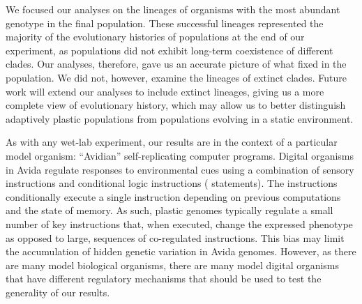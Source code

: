 We focused our analyses on the lineages of organisms with the most abundant genotype in the final population.
These successful lineages represented the majority of the evolutionary histories of populations at the end of our experiment, as populations did not exhibit long-term coexistence of different clades.
Our analyses, therefore, gave us an accurate picture of what fixed in the population.
We did not, however, examine the lineages of extinct clades.
Future work will extend our analyses to include extinct lineages, giving us a more complete view of evolutionary history, which may allow us to better distinguish adaptively plastic populations from populations evolving in a static environment. %

As with any wet-lab experiment, our results are in the context of a particular model organism: ``Avidian'' self-replicating computer programs.
Digital organisms in Avida regulate responses to environmental cues using a combination of sensory instructions and conditional logic instructions ( statements).
The  instructions conditionally execute a single instruction depending on previous computations and the state of memory.  
As such, plastic genomes typically regulate a small number of key instructions that, when executed, change the expressed phenotype as opposed to large, sequences of co-regulated instructions.
This bias may limit the accumulation of hidden genetic variation in Avida genomes. 
However, as there are many model biological organisms, there are many model digital organisms that have different regulatory mechanisms that should be used to test the generality of our results.

